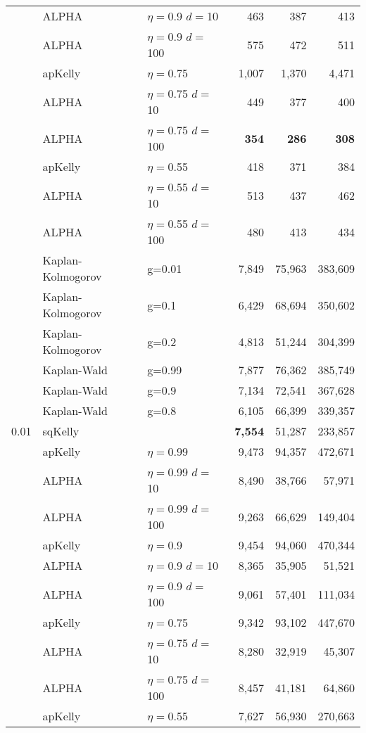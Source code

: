 \documentclass[aoas]{imsart}
\begin{document}
\begin{table}
\begin{tabular}{lll|rrr}
\cline{2-6}
& ALPHA & $\eta=$0.9 $d=$10 & 463  & 387  & 413  \\
& ALPHA & $\eta=$0.9 $d=$100 & 575  & 472  & 511  \\
\cline{2-6} & apKelly & $\eta=$0.75 & 1,007  & 1,370  & 4,471  \\
\cline{2-6}
& ALPHA & $\eta=$0.75 $d=$10 & 449  & 377  & 400  \\
& ALPHA & $\eta=$0.75 $d=$100 & \bf{354}  & \bf{286}  & \bf{308}  \\
\cline{2-6} & apKelly & $\eta=$0.55 & 418  & 371  & 384  \\
\cline{2-6}
& ALPHA & $\eta=$0.55 $d=$10 & 513  & 437  & 462  \\
& ALPHA & $\eta=$0.55 $d=$100 & 480  & 413  & 434  \\
\cline{2-6}
 & Kaplan-Kolmogorov & g=0.01 & 7,849  & 75,963  & 383,609  \\
 & Kaplan-Kolmogorov & g=0.1 & 6,429  & 68,694  & 350,602  \\
 & Kaplan-Kolmogorov & g=0.2 & 4,813  & 51,244  & 304,399  \\
\cline{2-6}
 & Kaplan-Wald & g=0.99 & 7,877  & 76,362  & 385,749  \\
 & Kaplan-Wald & g=0.9 & 7,134  & 72,541  & 367,628  \\
 & Kaplan-Wald & g=0.8 & 6,105  & 66,399  & 339,357  \\
\hline 0.01 & sqKelly & & \bf{7,554}  & 51,287  & 233,857  \\
\cline{2-6} & apKelly & $\eta=$0.99 & 9,473  & 94,357  & 472,671  \\
\cline{2-6}
& ALPHA & $\eta=$0.99 $d=$10 & 8,490  & 38,766  & 57,971  \\
& ALPHA & $\eta=$0.99 $d=$100 & 9,263  & 66,629  & 149,404  \\
\cline{2-6} & apKelly & $\eta=$0.9 & 9,454  & 94,060  & 470,344  \\
\cline{2-6}
& ALPHA & $\eta=$0.9 $d=$10 & 8,365  & 35,905  & 51,521  \\
& ALPHA & $\eta=$0.9 $d=$100 & 9,061  & 57,401  & 111,034  \\
\cline{2-6} & apKelly & $\eta=$0.75 & 9,342  & 93,102  & 447,670  \\
\cline{2-6}
& ALPHA & $\eta=$0.75 $d=$10 & 8,280  & 32,919  & 45,307  \\
& ALPHA & $\eta=$0.75 $d=$100 & 8,457  & 41,181  & 64,860  \\
\cline{2-6} & apKelly & $\eta=$0.55 & 7,627  & 56,930  & 270,663  \\

\end{tabular}
\end{table}
\end{document}
